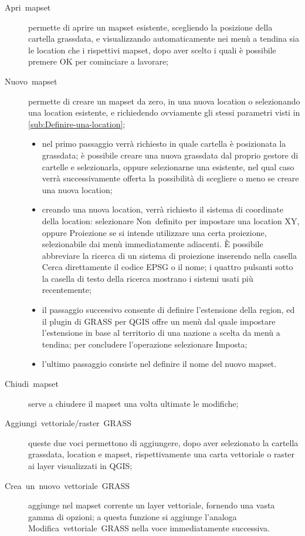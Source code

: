 	\begin{description}
		\item [{\textsf{Apri~mapset}}] permette di aprire un mapset esistente, scegliendo la posizione della cartella grassdata, e visualizzando automaticamente nei menù a tendina sia le location che i rispettivi mapset, dopo aver scelto i quali è possibile premere \textsf{OK }per cominciare a lavorare;
		\item [{\textsf{Nuovo~mapset}}] permette di creare un mapset da zero, in una nuova location o selezionando una location esistente, e richiedendo ovviamente gli stessi parametri visti in \textsection\ref{sub:Definire-una-location};

		\begin{itemize}
			\item nel primo passaggio verrà richiesto in quale cartella è posizionata la grassdata; è possibile creare una nuova grassdata dal proprio gestore di cartelle e selezionarla, oppure selezionarne una esistente, nel qual caso verrà successivamente offerta la possibilità di scegliere o meno se creare una nuova location;
			\item creando una nuova location, verrà richiesto il sistema di coordinate della location: selezionare \textsf{Non~definito} per impostare una location XY, oppure \textsf{Proiezione} se si intende utilizzare una certa proiezione, selezionabile dai menù immediatamente adiacenti. È possibile abbreviare la ricerca di un sistema di proiezione inserendo nella casella \textsf{Cerca} direttamente il codice EPSG o il nome; i quattro pulsanti sotto la casella di testo della ricerca mostrano i sistemi usati più recentemente;
			\item il passaggio successivo consente di definire l'estensione della region, ed il plugin di GRASS per QGIS offre un menù dal quale impostare l'estensione in base al territorio di una nazione a scelta da menù a tendina; per concludere l'operazione selezionare \textsf{Imposta};
			\item l'ultimo passaggio consiste nel definire il nome del nuovo mapset.
		\end{itemize}
	
		\item [{\textsf{Chiudi~mapset}}] serve a chiudere il mapset una volta ultimate le modifiche;
		\item [{\textsf{Aggiungi~vettoriale/raster~GRASS}}] queste due voci permettono di aggiungere, dopo aver selezionato la cartella grassdata, location e mapset, rispettivamente una carta vettoriale o raster ai layer visualizzati in QGIS;
		\item [{C\textsf{rea~un~nuovo~vettoriale~GRASS}}] aggiunge nel mapset corrente un layer vettoriale, fornendo una vasta gamma di opzioni; a questa funzione si aggiunge l'analoga \textsf{Modifica~vettoriale~GRASS} nella voce immediatamente successiva.
	\end{description}
	
